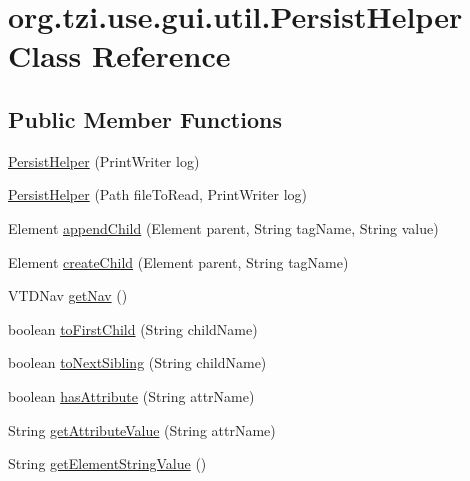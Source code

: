 \hypertarget{classorg_1_1tzi_1_1use_1_1gui_1_1util_1_1_persist_helper}{\section{org.\-tzi.\-use.\-gui.\-util.\-Persist\-Helper Class Reference}
\label{classorg_1_1tzi_1_1use_1_1gui_1_1util_1_1_persist_helper}
}
\subsection*{Public Member Functions}
\begin{DoxyCompactItemize}
\item 
\hyperlink{classorg_1_1tzi_1_1use_1_1gui_1_1util_1_1_persist_helper_a99e32ad4cb683e64038a2aea1a0983e6}{Persist\-Helper} (Print\-Writer log)
\item 
\hyperlink{classorg_1_1tzi_1_1use_1_1gui_1_1util_1_1_persist_helper_a1c64f13cb972df7592576e1e8b143f98}{Persist\-Helper} (Path file\-To\-Read, Print\-Writer log)
\item 
Element \hyperlink{classorg_1_1tzi_1_1use_1_1gui_1_1util_1_1_persist_helper_a616d3468304a8cbfd1fc1bbb8bee170c}{append\-Child} (Element parent, String tag\-Name, String value)
\item 
Element \hyperlink{classorg_1_1tzi_1_1use_1_1gui_1_1util_1_1_persist_helper_aee77769103302b2a3de348e3b0301889}{create\-Child} (Element parent, String tag\-Name)
\item 
V\-T\-D\-Nav \hyperlink{classorg_1_1tzi_1_1use_1_1gui_1_1util_1_1_persist_helper_a565ea75bdfa9338158ab6d972a218fcb}{get\-Nav} ()
\item 
boolean \hyperlink{classorg_1_1tzi_1_1use_1_1gui_1_1util_1_1_persist_helper_af13b02a9ef03607e604f413feae29fc7}{to\-First\-Child} (String child\-Name)
\item 
boolean \hyperlink{classorg_1_1tzi_1_1use_1_1gui_1_1util_1_1_persist_helper_af4feaa9701382d0154cb9a35269cb041}{to\-Next\-Sibling} (String child\-Name)
\item 
boolean \hyperlink{classorg_1_1tzi_1_1use_1_1gui_1_1util_1_1_persist_helper_aef5c71c09fce3d9c6c22e0df523ec097}{has\-Attribute} (String attr\-Name)
\item 
String \hyperlink{classorg_1_1tzi_1_1use_1_1gui_1_1util_1_1_persist_helper_a794913c40bf4ed78daa666c7166ae8ba}{get\-Attribute\-Value} (String attr\-Name)
\item 
String \hyperlink{classorg_1_1tzi_1_1use_1_1gui_1_1util_1_1_persist_helper_a0eb43986d0f2bf5ccea01d3bd907bb7c}{get\-Element\-String\-Value} ()

\end{DoxyCompactItemize}
